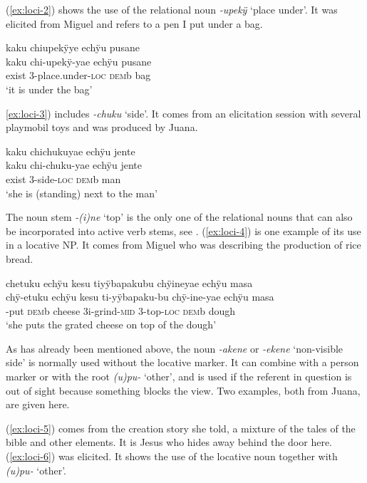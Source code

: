 (\ref{ex:loci-2}) shows the use of the relational noun \textit{-upekÿ} ‘place under’. It was elicited from Miguel and refers to a pen I put under a bag.

\ea\label{ex:loci-2}
\begingl 
\glpreamble kaku chiupekÿye echÿu pusane\\
\gla kaku chi-upekÿ-yae echÿu pusane\\ 
\glb exist 3-place.under-\textsc{loc} \textsc{dem}b bag\\ 
\glft ‘it is under the bag’
\trailingcitation{[mxx-e120505l-1]}
\xe

{\ref{ex:loci-3}) includes \textit{-chuku} ‘side’. It comes from an elicitation session with several playmobil toys and was produced by Juana.

\ea\label{ex:loci-3}
\begingl
\glpreamble kaku chichukuyae echÿu jente\\
\gla kaku chi-chuku-yae echÿu jente\\ 
\glb exist 3-side-\textsc{loc} \textsc{dem}b man\\ 
\glft ‘she is (standing) next to the man’
\xe

The noun stem \textit{-(i)ne} ‘top’ is the only one of the relational nouns that can also be incorporated into active verb stems, see .
(\ref{ex:loci-4}) is one example of its use in a locative NP. It comes from Miguel who was describing the production of rice bread.

\ea\label{ex:loci-4}
\begingl
\glpreamble chetuku echÿu kesu tiyÿbapakubu chÿineyae echÿu masa\\
\gla chÿ-etuku echÿu kesu ti-yÿbapaku-bu chÿ-ine-yae echÿu masa\\
-put \textsc{dem}b cheese 3i-grind-\textsc{mid} 3-top-\textsc{loc} \textsc{dem}b dough\\
\glft ‘she puts the grated cheese on top of the dough’
\endgl
\trailingcitation{[mxx-e120415ls.087]}
\xe

As has already been mentioned above, the noun \textit{-akene} or \textit{-ekene} ‘non-visible side’ is normally used without the locative marker. It can combine with a person marker or with the root \textit{(u)pu-} ‘other’, and is used if the referent in question is out of sight because something blocks the view. Two examples, both from Juana, are given here. 

(\ref{ex:loci-5}) comes from the creation story she told, a mixture of the tales of the bible and other elements. It is Jesus who hides away behind the door here. (\ref{ex:loci-6}) was elicited. It shows the use of the locative noun together with \textit{(u)pu-} ‘other’.

}

